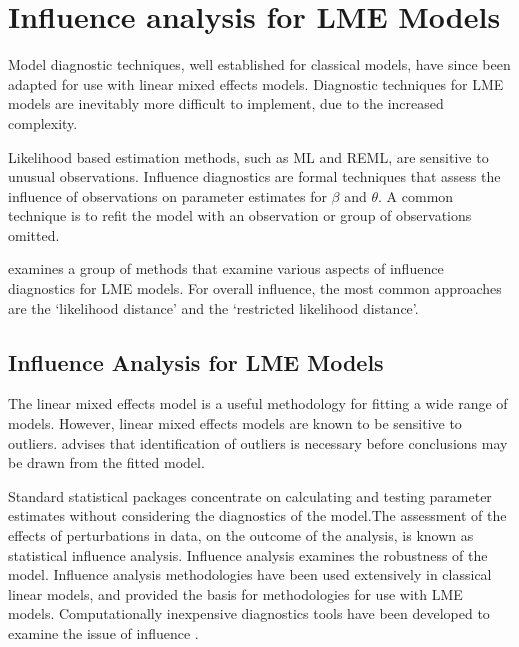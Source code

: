 \documentclass[Main.tex]{subfiles}
\begin{document}

\newpage	
			\section{Influence analysis for LME Models} %

				
				Model diagnostic techniques, well established for classical models, have since been adapted for use with linear mixed effects models. Diagnostic techniques for LME models are inevitably more difficult to implement, due to the increased complexity.
					
			Likelihood based estimation methods, such as ML and REML, are sensitive to unusual observations. Influence diagnostics are formal techniques that assess the influence of observations on parameter estimates for $\beta$ and $\theta$. A common technique is to refit the model with an observation or group of observations omitted.
			
			\citet{west} examines a group of methods that examine various aspects of influence diagnostics for LME models.
			For overall influence, the most common approaches are the `likelihood distance' and the `restricted likelihood distance'.
			
	
	\subsection{Influence Analysis for LME Models} %
	The linear mixed effects model is a useful methodology for fitting a wide range of models. However, linear mixed effects models are known to be sensitive to outliers. \citet{CPJ} advises that identification of outliers is necessary before conclusions may be drawn from the fitted model.
	
	Standard statistical packages concentrate on calculating and testing parameter estimates without considering the diagnostics of the model.The assessment of the effects of perturbations in data, on the outcome of the analysis, is known as statistical influence analysis. Influence analysis examines the robustness of the model. Influence analysis methodologies have been used extensively in classical linear models, and provided the basis for methodologies for use with LME models.
	Computationally inexpensive diagnostics tools have been developed to examine the issue of influence \citep{Zewotir}.
		
\end{document}
